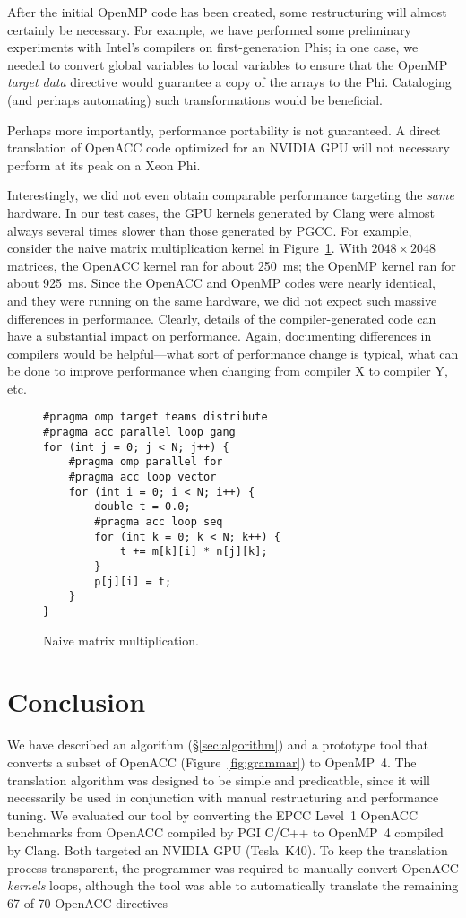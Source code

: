 \documentclass{sig-alternate-05-2015}
\begin{document}
After the initial OpenMP code has been created, some restructuring will almost
certainly be necessary.  For example, we have performed some preliminary
experiments with Intel's compilers on first-generation Phis; in one case, we
needed to convert global variables to local variables to ensure that the OpenMP
\emph{target data} directive would guarantee a copy of the arrays to the Phi.
Cataloging (and perhaps automating) such transformations would be beneficial.

Perhaps more importantly, performance portability is not guaranteed.  A direct
translation of OpenACC code optimized for an NVIDIA GPU will not necessary
perform at its peak on a Xeon Phi.

Interestingly, we did not even obtain comparable performance targeting the
\emph{same} hardware.  In our test cases, the GPU kernels generated by Clang
were almost always several times slower than those generated by PGCC.  For
example, consider the naive matrix multiplication kernel in
Figure~\ref{fig:matmul}.  With $2048 \times 2048$ matrices, the OpenACC kernel
ran for about 250~ms; the OpenMP kernel ran for about 925~ms.  Since the
OpenACC and OpenMP codes were nearly identical, and they were running on the
same hardware, we did not expect such massive differences in performance.
Clearly, details of the compiler-generated code can have a substantial impact
on performance.  Again, documenting differences in compilers would be
helpful---what sort of performance change is typical, what can be done to
improve performance when changing from compiler X to compiler Y, etc.

\begin{figure}
\begin{verbatim}
#pragma omp target teams distribute
#pragma acc parallel loop gang
for (int j = 0; j < N; j++) {
    #pragma omp parallel for
    #pragma acc loop vector
    for (int i = 0; i < N; i++) {
        double t = 0.0;
        #pragma acc loop seq
        for (int k = 0; k < N; k++) {
            t += m[k][i] * n[j][k];
        }
        p[j][i] = t;
    }
}
\end{verbatim}
\caption{Naive matrix multiplication.}
\label{fig:matmul}
\end{figure}

\section{Conclusion}

We have described an algorithm (\S\ref{sec:algorithm}) and a prototype tool
that converts a subset of OpenACC (Figure~\ref{fig:grammar}) to OpenMP~4.  The
translation algorithm was designed to be simple and predicatble, since it will
necessarily be used in conjunction with manual restructuring and performance
tuning.  We evaluated our tool by converting the EPCC Level~1 OpenACC
benchmarks from OpenACC compiled by PGI C/C++ to OpenMP~4 compiled by Clang.
Both targeted an NVIDIA GPU (Tesla~K40).  To keep the translation process
transparent, the programmer was required to manually convert OpenACC
\emph{kernels} loops, although the tool was able to automatically translate the
remaining 67 of 70 OpenACC directives
\end{document}
